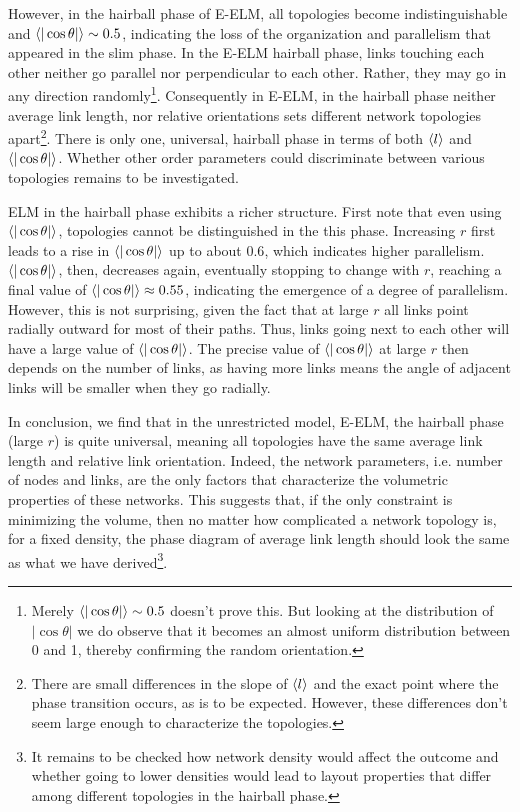 \documentclass[nofootinbib,preprint,endfloats]{revtex4} %
\begin{document}
However, in the hairball phase of E-ELM, all topologies become indistinguishable and $\be{|\cos\theta|} \sim 0.5 $, indicating the loss of the organization and parallelism that appeared in the slim phase. 
In the E-ELM hairball phase, links touching each other neither go parallel nor perpendicular to each other.
Rather, they may go in any direction randomly\footnote{Merely  $\be{|\cos\theta|} \sim 0.5 $ doesn't prove this. But looking at the distribution of $|\cos\theta|$ we do observe that it becomes an almost uniform distribution between 0 and 1, thereby confirming the random orientation.}. 
Consequently in E-ELM, %
in the hairball phase %
neither average link length, nor relative orientations sets different network topologies apart\footnote{
There are small differences in the slope of $\left<l\right>$ and the exact point where the phase transition occurs, as is to be expected.
However, these differences don't seem large enough to characterize the topologies.}. 
There is only one, universal, hairball phase in terms of both $\left<l\right>$ and $\be{|\cos\theta|}$. 
Whether other order parameters could discriminate between various topologies remains to be investigated. 

ELM in the hairball phase exhibits a richer structure. 
First note that even using $\be{|\cos\theta|} $, topologies cannot be distinguished in the this phase. 
Increasing $r$ first leads to a rise in $\be{|\cos\theta|} $ up to about $0.6$, which indicates higher parallelism. 
$\be{|\cos\theta|}$, then, decreases again, eventually stopping to change with $r$, reaching a final value of $\be{|\cos\theta|} \approx 0.55 $, indicating the emergence of a degree of parallelism. 
However, this is not surprising, given the fact that at large $r$ all links point radially outward for most of their paths. Thus, links going next to each other will have a large value of  $\be{|\cos\theta|}$. The precise value of $\be{|\cos\theta|}$ at large $r$ then depends on the number of links, as having more links means the angle of adjacent links will be smaller when they go radially. 

In conclusion, we find that in the unrestricted model, E-ELM, the hairball phase (large $r$) is quite universal, meaning all topologies have the same average link length and relative link orientation.   
Indeed, the network parameters, i.e. number of nodes and links, are the only factors that characterize the volumetric properties of these networks. 
This suggests that, if the only constraint is minimizing the volume, then no matter how complicated a network topology is, for a fixed density, the phase diagram of average link length should look the same as what we have derived\footnote{
It remains to be checked how network density would affect the outcome and whether going to lower densities would lead to layout properties that differ among different topologies in the hairball phase.}.
\end{document}
